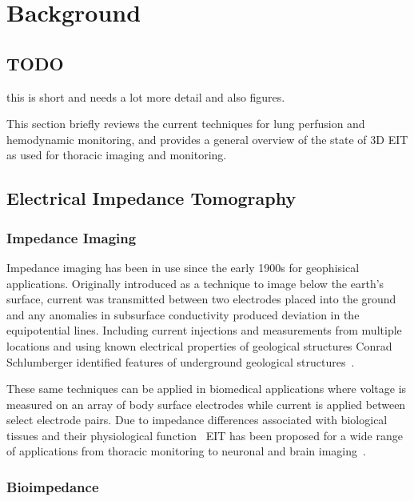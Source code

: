 \chapter{Background}

\section{TODO}
this is short and needs a lot more detail and also figures.

This section briefly reviews the current techniques for lung perfusion and hemodynamic
monitoring, and provides a general overview 
of the state of 3D EIT as used for thoracic imaging and monitoring.

\section{Electrical Impedance Tomography}

\subsection{Impedance Imaging}
Impedance imaging has been in use since the early 1900s for geophisical applications.  
Originally introduced as a technique to image below the earth’s surface, 
current was transmitted between two electrodes placed into the ground and any 
anomalies in subsurface conductivity produced deviation 
in the equipotential lines. 
Including current injections and measurements from multiple locations and using known 
electrical properties of geological structures Conrad Schlumberger identified
features of underground geological structures~\parencite{allaud_schlumberger_1977}.

These same techniques can be applied in biomedical applications where
voltage is measured on an array of body surface electrodes 
while current is applied between select electrode pairs. 
Due to impedance differences associated with biological tissues and their physiological 
function~\parencite{Geddes1967,McAdams1995}
EIT has been proposed for a wide range of applications from thoracic monitoring to neuronal and 
brain imaging~\parencite{Holder1992,Frerichs2016}. 

\subsection{Bioimpedance}


